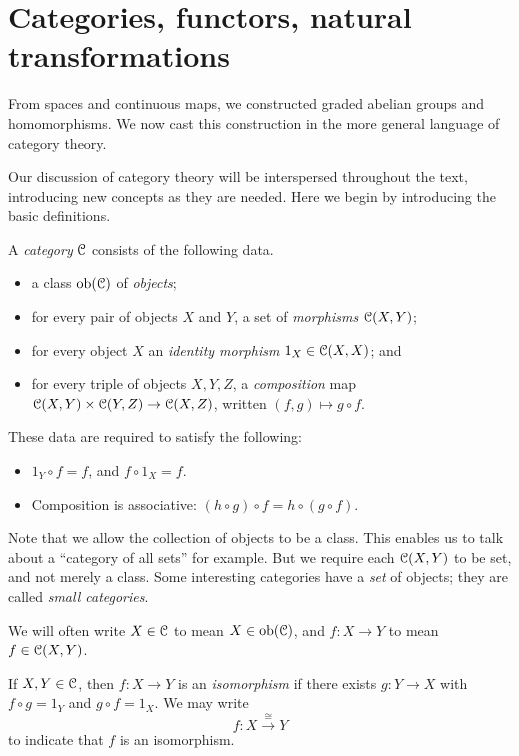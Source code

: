 \section{Categories, functors, natural transformations}\label{categories}
From spaces and continuous maps, we constructed graded abelian groups and homomorphisms. We now cast this construction in the more general language of category theory.

Our discussion of category theory will be interspersed throughout the text, introducing new concepts as they are needed. Here we begin by introducing the basic definitions.

\begin{definition}
A \emph{category} $\mathcal C$ consists of the following data.
\begin{itemize}
\item a class $\mathrm{ob}(\mathcal C)$ of {\em objects};
\item for every pair of objects $X$ and $Y$, a set of \emph{morphisms} 
$\mathcal C(X,Y)$;
\item for every object $X$ an {\em identity morphism} $1_X\in\mathcal C(X,X)$; and
\item for every triple of objects $X,Y,Z$, a {\em composition} map
$\mathcal C(X,Y)\times\mathcal C(Y,Z)\to\mathcal C(X,Z)$, written $(f,g)\mapsto g \circ f$. 
\end{itemize}
These data are required to satisfy the following:
\begin{itemize}
\item $1_Y\circ f=f$, and $f\circ 1_X=f$.
\item Composition is associative: $(h\circ g)\circ f=h\circ(g\circ f)$.
\end{itemize}
\end{definition}
Note that we allow the collection of objects to be a class. This enables us to talk about a ``category of all sets'' for example. But we require each 
$\mathcal C(X,Y)$ to be set, and not merely a class. Some interesting categories have
a {\em set} of objects; they are called {\em small categories}.

We will often write $X\in\mathcal C$ to mean $X\in\mathrm{ob}(\mathcal C)$, and $f\colon X\to Y$ to mean $f\in \mathcal C(X,Y)$.
\begin{definition}
If $X,Y\in \mathcal C$, then $f\colon X\to Y$ is an \emph{isomorphism} if there exists $g\colon Y\to X$ with $f \circ g=1_Y$ and $g\circ f=1_X$. We may write
\[
f:X\xrightarrow{\cong}Y
\]
to indicate that $f$ is an isomorphism. 
\end{definition}


